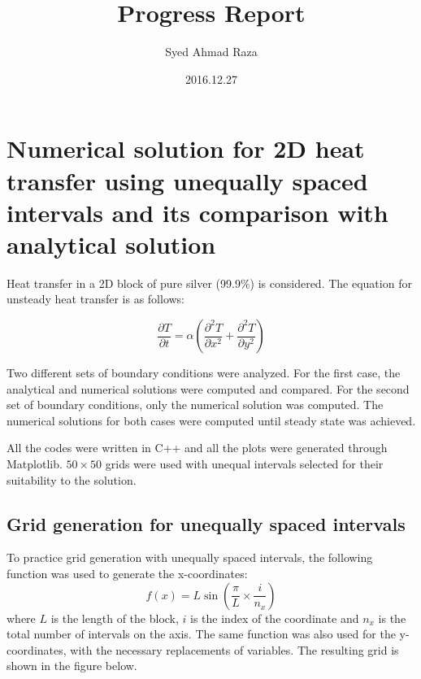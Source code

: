 \documentclass[12pt,a4paper,fleqn]{article}
\title{Progress Report}
\author{Syed Ahmad Raza}
\date{2016.12.27}
\begin{document}
\maketitle
\section*{Numerical solution for 2D heat transfer using unequally spaced
intervals and its comparison with analytical solution}

Heat transfer in a 2D block of pure silver (99.9\%) is considered. The equation
for unsteady heat transfer is as follows:

\begin{equation}
\frac{\partial T}{\partial t} = \alpha\left(\frac{\partial^2T}{\partial x^2} +
\frac{\partial^2T}{\partial y^2}\right)
\end{equation}

Two different sets of boundary conditions were analyzed. For the first case, the
analytical and numerical solutions were computed and compared. For the second
set of boundary conditions, only the numerical solution was computed. The
numerical solutions for both cases were computed until steady state was
achieved.

All the codes were written in C++ and all the plots were generated through
Matplotlib. $50 \times 50$ grids were used with unequal intervals selected for
their suitability to the solution.

\subsection*{Grid generation for unequally spaced intervals}
To practice grid generation with unequally spaced intervals, the following
function was used to generate the x-coordinates:
\begin{equation}
f(x)=L\sin\left(\frac{\pi}{L}\times\frac{i}{n_x}\right)
\end{equation}
where $L$ is the length of the block, $i$ is the index of the coordinate and
$n_x$ is the total number of intervals on the axis. The same function was
also used for the y-coordinates, with the necessary replacements of
variables. The resulting grid is shown in the figure below.
\end{document}
